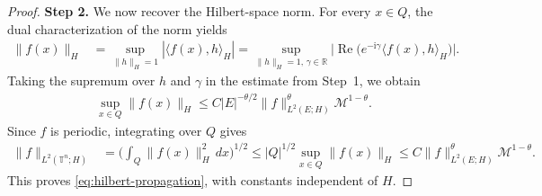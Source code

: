 \documentclass[10pt,a4paper]{amsart}
\theoremstyle{plain}
\theoremstyle{remark}
\theoremstyle{definition}
\theoremstyle{plain}
\begin{document}
\begin{proof}
\textbf{Step 2.} We now recover the Hilbert-space norm.
For every \(x\in Q\), the dual characterization of the norm yields
\begin{align*}
\|f(x)\|_H
&=\sup_{\|h\|_H=1}|\langle f(x),h\rangle_H|
=\sup_{\|h\|_H=1,\,\gamma\in\mathbb R}
\bigl|\operatorname{Re}\bigl(e^{-\mathrm{i}\gamma}\langle f(x),h\rangle_H\bigr)\bigr|.
\end{align*}
Taking the supremum over \(h\) and \(\gamma\) in the estimate from Step~1, we obtain
\begin{align*}
\sup_{x\in Q}\|f(x)\|_H
\leq C|E|^{-\theta/2}
\|f\|_{L^2(E;H)}^\theta\mathcal M^{1-\theta}.
\end{align*}
Since \(f\) is periodic, integrating over \(Q\) gives
\begin{align*}
\|f\|_{L^2(\mathbb T^n;H)}
&=\biggl(\int_Q\|f(x)\|_H^2\,dx\biggr)^{1/2}\leq |Q|^{1/2}\sup_{x\in Q}\|f(x)\|_H
\leq C\|f\|_{L^2(E;H)}^\theta\mathcal M^{1-\theta}.
\end{align*}
This proves \eqref{eq:hilbert-propagation}, with constants independent of \(H\).
\end{proof}
\end{document}
